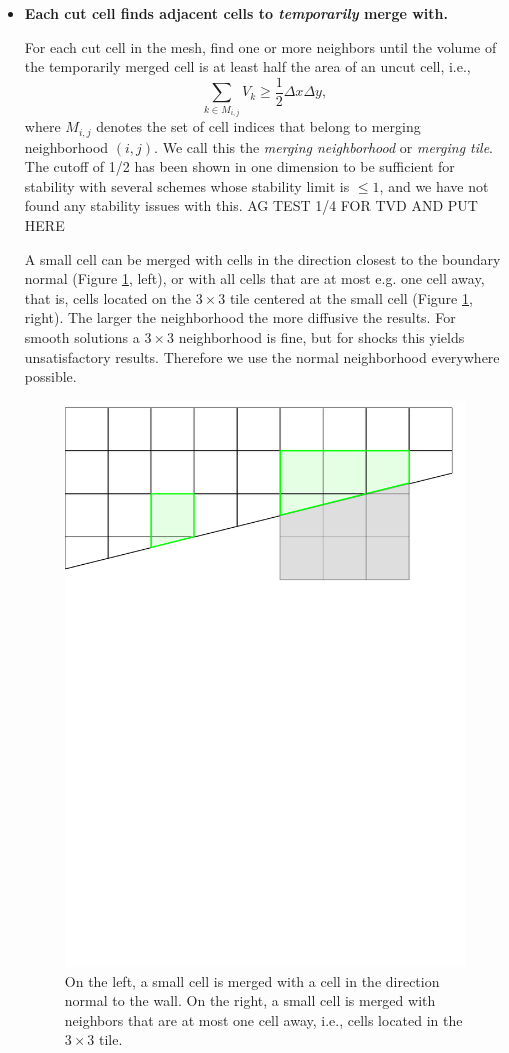 \begin{itemize}
\item
{\bf Each cut cell finds adjacent cells to {\em temporarily} merge with.}

\vspace*{.1in}
For each cut cell in the mesh, find  one or more neighbors until the
volume of the temporarily merged cell is at least half the area of an uncut cell, i.e., 
\begin{equation} \label{eqn:vmerge}
\sum_{k \in M_{i,j}} V_{k} \geq \frac{1}{2}\Delta x\Delta y,
\end{equation}
where $M_{i,j}$ denotes the set of cell indices that belong to 
merging neighborhood $(i,j)$.  We call this the 
{\em  merging neighborhood} or {\em merging tile}.  
The cutoff of 1/2 has been shown in one dimension \cite{mjb:stability2} to be 
sufficient for
stability with several schemes whose stability limit is $\le 1$, and we
have not found any stability issues with this. AG TEST 1/4 FOR TVD AND PUT HERE

A small cell can be merged with cells in the direction closest to the 
boundary normal (Figure \ref{fig:neighborhoods}, left), or with all cells 
that are at most e.g. one cell away, that is, cells located on the $3 \times 3$ 
tile centered at the small cell (Figure \ref{fig:neighborhoods}, right).
The larger the neighborhood the more diffusive the results. 
For smooth solutions a $3 \times 3$ neighborhood is fine, but for shocks this 
yields unsatisfactory results.
Therefore we use the normal neighborhood everywhere possible.

\begin{figure}[t]
    \centering
    \includegraphics[width=0.5\linewidth]{figs/neighborhoods.pdf}
    \caption{\sf On the left, a small cell is merged with a cell in the direction 
    normal to  the wall.  On the right, a small cell is merged with neighbors that are at most one cell away, i.e., cells located in the $3\times3$ tile.}
    \label{fig:neighborhoods}
\end{figure}



\end{itemize}
